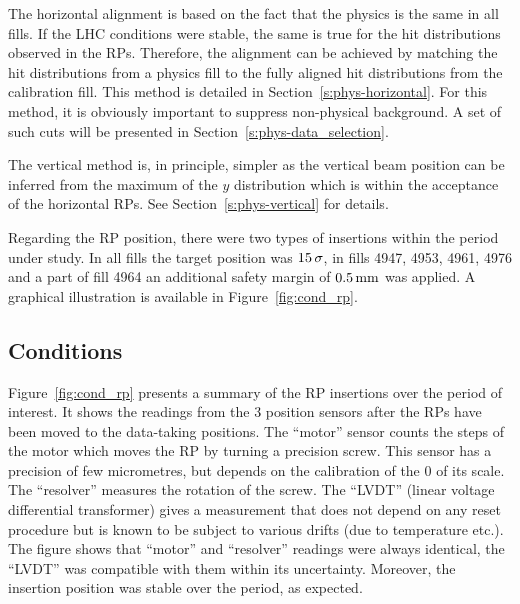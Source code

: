 \documentclass[TOTEM]{cern/cernphprep}
\def\un#1{\,{\rm #1}}
\begin{document}
The horizontal alignment is based on the fact that the physics is the same in all fills. If the LHC conditions were stable, the same is true for the hit distributions observed in the RPs. Therefore, the alignment can be achieved by matching the hit distributions from a physics fill to the fully aligned hit distributions from the calibration fill. This method is detailed in Section~\ref{s:phys-horizontal}. For this method, it is obviously important to suppress non-physical background. A set of such cuts will be presented in Section~\ref{s:phys-data_selection}.

The vertical method is, in principle, simpler as the vertical beam position can be inferred from the maximum of the $y$ distribution which is within the acceptance of the horizontal RPs. See Section~\ref{s:phys-vertical} for details.

Regarding the RP position, there were two types of insertions within the period under study. In all fills the target position was $15\un{\sigma}$, in fills 4947, 4953, 4961, 4976 and a part of fill 4964 an additional safety margin of $0.5\un{mm}$ was applied. A graphical illustration is available in Figure~\ref{fig:cond_rp}.

\subsection{Conditions}
\label{s:phys-conditions}

Figure~\ref{fig:cond_rp} presents a summary of the RP insertions over the period of interest. It shows the readings from the 3 position sensors after the RPs have been moved to the data-taking positions. The ``motor'' sensor counts the steps of the motor which moves the RP by turning a precision screw. This sensor has a precision of few micrometres, but depends on the calibration of the 0 of its scale. The ``resolver'' measures the rotation of the screw. The ``LVDT'' (linear voltage differential transformer) gives a measurement that does not depend on any reset procedure but is known to be subject to various drifts (due to temperature etc.). The figure shows that ``motor'' and ``resolver'' readings were always identical, the ``LVDT'' was compatible with them within its uncertainty. Moreover, the insertion position was stable over the period, as expected.
\end{document}
